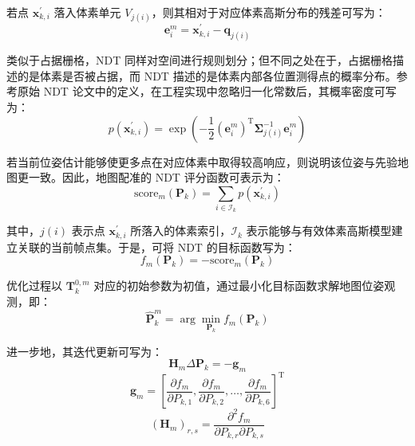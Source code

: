 若点 $\mathbf{x}_{k,i}^{\prime}$ 落入体素单元 $V_{j(i)}$，则其相对于对应体素高斯分布的残差可写为：
\begin{equation}
\mathbf{e}_{i}^{m}
=
\mathbf{x}_{k,i}^{\prime}-\mathbf{q}_{j(i)}
\end{equation}

类似于占据栅格，NDT 同样对空间进行规则划分；但不同之处在于，占据栅格描述的是体素是否被占据，而 NDT 描述的是体素内部各位置测得点的概率分布。参考原始 NDT 论文中的定义，在工程实现中忽略归一化常数后，其概率密度可写为：
\begin{equation}
p\!\left(\mathbf{x}_{k,i}^{\prime}\right)
=
\exp\left(
-\frac{1}{2}
\left(\mathbf{e}_{i}^{m}\right)^{\mathrm{T}}
\boldsymbol{\Sigma}_{j(i)}^{-1}
\mathbf{e}_{i}^{m}
\right)
\end{equation}

若当前位姿估计能够使更多点在对应体素中取得较高响应，则说明该位姿与先验地图更一致。因此，地图配准的 NDT 评分函数可表示为：
\begin{equation}
\mathrm{score}_{m}\left(\mathbf{P}_{k}\right)
=
\sum_{i\in\mathcal{I}_{k}}
p\!\left(\mathbf{x}_{k,i}^{\prime}\right)
\end{equation}

其中，$j(i)$ 表示点 $\mathbf{x}_{k,i}^{\prime}$ 所落入的体素索引，$\mathcal{I}_{k}$ 表示能够与有效体素高斯模型建立关联的当前帧点集。于是，可将 NDT 的目标函数写为：
\begin{equation}
f_{m}\left(\mathbf{P}_{k}\right)
=
-\mathrm{score}_{m}\left(\mathbf{P}_{k}\right)
\end{equation}

优化过程以 $\mathbf{T}_{k}^{0,m}$ 对应的初始参数为初值，通过最小化目标函数求解地图位姿观测，即：
\begin{equation}
\hat{\mathbf{P}}_{k}^{m}
=
\arg \min_{\mathbf{P}_{k}}
f_{m}\left(\mathbf{P}_{k}\right)
\end{equation}

进一步地，其迭代更新可写为：
\begin{equation}
\mathbf{H}_{m}\Delta \mathbf{P}_{k}
=
-\mathbf{g}_{m}
\end{equation}
\begin{equation}
\mathbf{g}_{m}
=
\left[
\frac{\partial f_m}{\partial P_{k,1}},
\frac{\partial f_m}{\partial P_{k,2}},
\ldots,
\frac{\partial f_m}{\partial P_{k,6}}
\right]^{\mathrm{T}}
\end{equation}
\begin{equation}
\left(\mathbf{H}_{m}\right)_{r,s}
=
\frac{\partial^{2}f_m}
{\partial P_{k,r}\partial P_{k,s}}
\end{equation}

